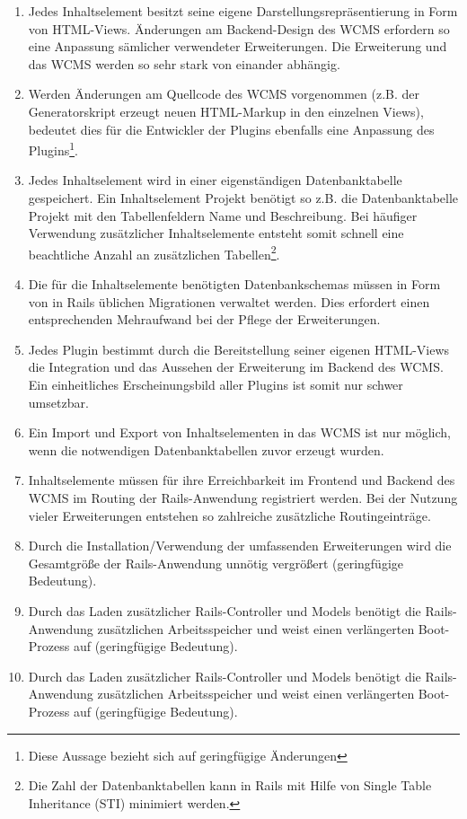 \begin{enumerate}
\item
Jedes Inhaltselement besitzt seine eigene Darstellungsrepräsentierung in Form von HTML-Views. Änderungen am Backend-Design des WCMS erfordern so eine Anpassung sämlicher verwendeter Erweiterungen. Die Erweiterung und das WCMS werden so sehr stark von einander abhängig.
\item
Werden Änderungen am Quellcode des WCMS vorgenommen (z.B. der Generatorskript erzeugt neuen HTML-Markup in den einzelnen Views), bedeutet dies für die Entwickler der Plugins ebenfalls eine Anpassung des Plugins\footnote{Diese Aussage bezieht sich auf geringfügige Änderungen}.
\item
Jedes Inhaltselement wird in einer eigenständigen Datenbanktabelle gespeichert. Ein Inhaltselement Projekt
benötigt so z.B. die Datenbanktabelle Projekt mit den Tabellenfeldern Name und Beschreibung. Bei häufiger Verwendung zusätzlicher Inhaltselemente entsteht somit schnell eine beachtliche Anzahl an zusätzlichen Tabellen\footnote{Die Zahl der Datenbanktabellen kann in Rails mit Hilfe von Single Table Inheritance (STI) minimiert werden.}.
\item
Die für die Inhaltselemente benötigten Datenbankschemas müssen in Form von in Rails üblichen Migrationen verwaltet werden. Dies erfordert einen entsprechenden Mehraufwand bei der Pflege der Erweiterungen.
\item
Jedes Plugin bestimmt durch die Bereitstellung seiner eigenen HTML-Views die Integration und das Aussehen der Erweiterung im Backend des WCMS. Ein einheitliches Erscheinungsbild aller Plugins ist somit nur schwer umsetzbar.
\item
Ein Import und Export von Inhaltselementen in das WCMS ist nur möglich, wenn die notwendigen Datenbanktabellen zuvor erzeugt wurden.
\item
Inhaltselemente müssen für ihre Erreichbarkeit im Frontend und Backend des WCMS im Routing der Rails-Anwendung registriert werden. Bei der Nutzung vieler Erweiterungen entstehen so zahlreiche zusätzliche Routingeinträge.
\item
Durch die Installation/Verwendung der umfassenden Erweiterungen wird die Gesamtgröße der Rails-Anwendung unnötig vergrößert (geringfügige Bedeutung).
\item
Durch das Laden zusätzlicher Rails-Controller und Models benötigt die Rails-Anwendung zusätzlichen Arbeitsspeicher und weist einen verlängerten Boot-Prozess auf (geringfügige Bedeutung).
\item
Durch das Laden zusätzlicher Rails-Controller und Models benötigt die Rails-Anwendung zusätzlichen Arbeitsspeicher und weist einen verlängerten Boot-Prozess auf (geringfügige Bedeutung).
\end{enumerate}


